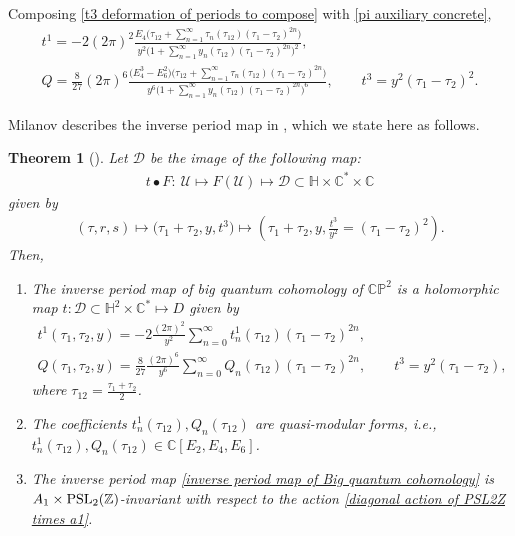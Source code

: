 \documentclass[11pt]{article}
\numberwithin{equation}{section}
\numberwithin{equation}{section}
\newtheorem{Theorem}{Theorem}[section]
\begin{document}
 Composing \eqref{t3 deformation of periods to compose} with \eqref{pi auxiliary concrete},
\begin{gather*}
t^1=-2 (2\pi )^2\frac{E_4\bigl(\tau_{12}+\sum_{n=1}^{\infty} \tau_{n}(\tau_{12}) (\tau_1-\tau_2)^{2n} \bigr)}{y^2\bigl( 1+\sum_{n=1}^{\infty} y_n(\tau_{12})(\tau_1-\tau_2)^{2n} \bigr)^2},\\
Q=\frac{8}{27}(2\pi)^6 \frac{\bigl(E_4^3-E_6^2\bigr)\bigl(\tau_{12}+\sum_{n=1}^{\infty} \tau_{n}(\tau_{12}) (\tau_1-\tau_2)^{2n} \bigr)}{y^6\bigl( 1+\sum_{n=1}^{\infty} y_n(\tau_{12})(\tau_1-\tau_2)^{2n} \bigr)^6},\qquad
t^3=y^2(\tau_1-\tau_2)^2.
\end{gather*}

 Milanov describes the inverse period map in \cite[Theorem 2.4]{Milanov}, which we state here as follows.

\begin{Theorem}[{\cite{Milanov}}]
Let $\mathcal{D}$ be the image of the following map:
\begin{gather*}
 t\bullet F\colon\ \mathcal{U}\mapsto F(\mathcal{U})\mapsto \mathcal{D}\subset \mathbb{H}\times\mathbb{C}^{*}\times\mathbb{C}
\end{gather*}
given by
\begin{gather*}
(\tau,r,s)\mapsto \bigl(\tau_1+\tau_2,y,t^3\bigr)\mapsto \left(\tau_1+\tau_2,y,\frac{t^3}{y^2}=(\tau_1-\tau_2)^2\right).
\end{gather*}
Then,
\begin{enumerate}\itemsep=0pt
\item[$(1)$]
The inverse period map of big quantum cohomology of $\mathbb{CP}^2$ is a holomorphic map $t\colon \mathcal{D}\subset \mathbb{H}^2\times \mathbb{C}^{*} \mapsto D$
given by
\begin{gather}
t^1(\tau_1,\tau_2,y)=-2\frac{ (2\pi )^2}{y^2}\sum_{n=0}^{\infty} t^1_n(\tau_{12})(\tau_1-\tau_2)^{2n} ,\nonumber\\
Q(\tau_1,\tau_2,y)=\frac{8}{27}\frac{(2\pi)^6 }{y^6}\sum_{n=0}^{\infty} Q_n(\tau_{12})(\tau_1-\tau_2)^{2n},\qquad
t^3=y^2(\tau_1-\tau_2),\label{inverse period map of Big quantum cohomology}
\end{gather}
where $\tau_{12}=\frac{\tau_1+\tau_2}{2}$.
\item[$(2)$]
The coefficients $t^1_n(\tau_{12}), Q_n(\tau_{12})$ are quasi-modular forms, i.e.,
$
t^1_n(\tau_{12}), Q_n(\tau_{12})\in \mathbb{C}[E_2,\allowbreak E_4,E_6]$.
\item[$(3)$] The inverse period map \eqref{inverse period map of Big quantum cohomology} is $A_1\times {\rm PSL}_2(\mathbb{Z})$-invariant with respect to the action \eqref{diagonal action of PSL2Z times a1}.

\end{enumerate}

\end{Theorem}
\end{document}
